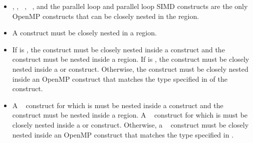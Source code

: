 \begin{itemize}
\item {}, , ~, ~, and 
the parallel loop and parallel loop SIMD constructs are the only OpenMP constructs 
that can be closely nested in the  region. 

\item A  construct must be closely nested in a  region. 

\item If  is , the 
construct must be closely nested inside a  construct and the
 construct must be nested inside a  region.
If  is , the 
construct must be closely nested inside a  or 
construct. Otherwise, the  construct must be closely nested
inside an OpenMP construct that matches the type specified in
 of the  construct.

\item A ~ construct for which
 is  must be nested inside
a  construct and the ~ construct
must be nested inside a  region. A
~ construct for which
 is  must be closely nested
inside a  or  construct. Otherwise, a
~ construct must be closely nested inside
an OpenMP construct that matches the type specified in
.
\end{itemize}


